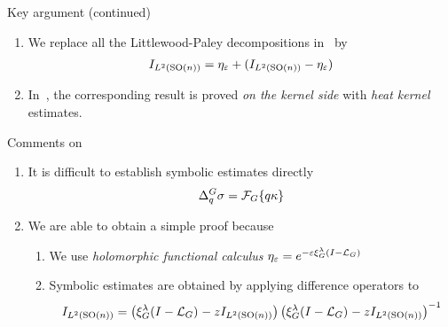\documentclass{beamer}
\begin{document}
\begin{frame}{Key argument (continued)}
    \begin{enumerate}
        \item
            We replace all the Littlewood-Paley decompositions in~\cite{Fischer2015,FischerRuzhansky16} by
            \begin{align*}
                {I_{{L^{2} ({\mathrm{SO} (n)})}}}
                =
                \eta_\varepsilon +
                ({I_{{L^{2} ({\mathrm{SO} (n)})}}} - \eta_\varepsilon)
            \end{align*}
            \pause
        \item
            In~\cite{FischerRuzhansky16,Fischer2015},
            the corresponding result is proved \emph{on the kernel side} with \emph{heat kernel} estimates.
    \end{enumerate}
\end{frame}

\begin{frame}{Comments on \cite{FischerRuzhansky16}}
    \begin{enumerate}
        \item
            It is difficult to establish symbolic estimates directly
            \begin{align*}
                {\Delta^{G}_{q}} \sigma = \mathcal{F}_{G} \{q \kappa\}
            \end{align*}

            \pause
        \item
            We are able to obtain a simple proof because
            \pause
            \begin{enumerate}
                \item We use \emph{holomorphic functional calculus}
                    $\eta_\varepsilon = e^{-\varepsilon \xi^{\lambda}_{G} (I - {\mathcal{L}_{G}})^{}}$
                    \pause
                \item Symbolic estimates are obtained by applying difference operators to
                    \begin{align*}
                        {I_{{L^{2} ({\mathrm{SO} (n)})}}} =
                        \left(\xi^{\lambda}_{G} (I - {\mathcal{L}_{G}})^{} - z {I_{{L^{2} ({\mathrm{SO} (n)})}}}\right)
                        \left(\xi^{\lambda}_{G} (I - {\mathcal{L}_{G}})^{} - z {I_{{L^{2} ({\mathrm{SO} (n)})}}}\right)^{-1}
                    \end{align*}
            \end{enumerate}
    \end{enumerate}
\end{frame}
\end{document}
